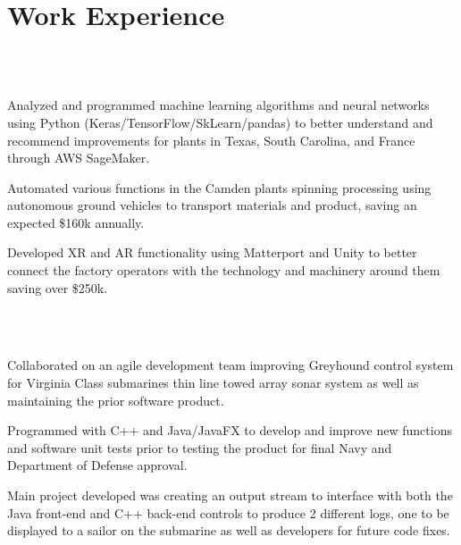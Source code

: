 \documentclass[letterpaper]{deedy-resume}
\begin{document}
\begin{minipage}[t]{0.69\textwidth} 

\section{Work Experience}

 \\  \\

\vspace{\topsep} 
\begin{tightitemize}
\item Analyzed and programmed machine learning algorithms and neural networks using Python (Keras/TensorFlow/SkLearn/pandas) to better understand and recommend improvements for plants in Texas, South Carolina, and France through AWS SageMaker.
\item Automated various functions in the Camden plants spinning processing using autonomous ground vehicles to transport materials and product, saving an expected \$160k annually. 
\item Developed XR and AR functionality using Matterport and Unity to better connect the factory operators with the technology and machinery around them saving over \$250k.
\end{tightitemize}

\sectionspace

 \\ \\

\vspace{\topsep} 
\begin{tightitemize}
\item Collaborated on an agile development team improving Greyhound control system for Virginia Class submarines thin line towed array sonar system as well as maintaining the prior software product.
\item Programmed with C++ and Java/JavaFX to develop and improve new functions and software unit tests prior to testing the product for final Navy and Department of Defense approval. 
\item Main project developed was creating an output stream to interface with both the Java front-end and C++ back-end controls to produce 2 different logs, one to be displayed to a sailor on the submarine as well as developers for future code fixes.
\end{tightitemize}


\end{minipage}
\end{document}
